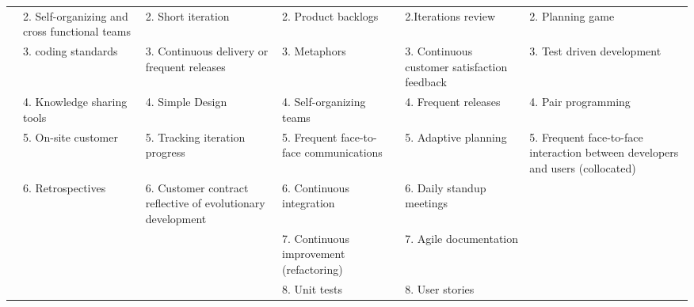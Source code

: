 \documentclass[a4paper,oneside]{bth}
\begin{document}
\begin{longtable}{|p{1.3cm}|p{2cm}|p{2cm}|p{2.7cm}|p{2cm} |p{2cm} |}
				& 2. Self-organizing and cross functional teams        & 2. Short iteration                                          & 2. Product backlogs                                                                                 & 2.Iterations review                                    & 2. Planning game                                                                             \\ \cline{2-6} 
				& 3. coding standards                                  & 3. Continuous delivery or frequent releases                 & 3. Metaphors                                                                                        & 3. Continuous customer satisfaction feedback           & 3. Test driven development                                                                   \\ \cline{2-6} 
				& 4. Knowledge sharing tools                           & 4. Simple Design                                            & 4. Self-organizing teams                                                                            & 4. Frequent releases                                   & 4. Pair programming                                                                          \\ \cline{2-6} 
				& 5. On-site customer                                  & 5. Tracking iteration progress                              & 5. Frequent face-to-face communications                                                             & 5. Adaptive planning                                   & 5. Frequent face-to-face interaction between developers and users (collocated)               \\ \cline{2-6} 
				& 6. Retrospectives                                    & 6. Customer contract reflective of evolutionary development & 6. Continuous integration                                                                           & 6. Daily standup meetings                              & \multirow{4}{*}{}                                                                            \\ \cline{2-5}
				& \multirow{3}{*}{}                                    & \multirow{3}{*}{}                                           & 7. Continuous improvement (refactoring)                                                             & 7. Agile documentation                                 &                                                                                              \\ \cline{4-5}
				&                                                      &                                                             & 8. Unit tests                                                                                       & 8. User stories                                        &                                                                                              \\ \cline{4-5}

\end{longtable}
\end{document}
